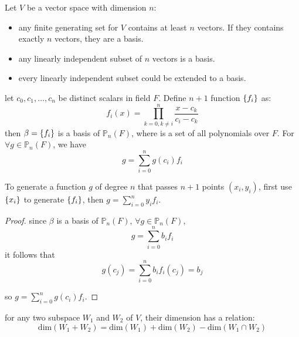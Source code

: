 \begin{theorem}
    Let $V$ be a vector space with dimension $n$:
    \begin{itemize}
        \item any finite generating set for $V$ contains at least $n$ vectors. If they contains exactly $n$ vectors, they are a basis.
        \item any linearly independent subset of $n$ vectors is a basis.
        \item every linearly independent subset could be extended to a basis.
    \end{itemize}    
\end{theorem}




\begin{definition}\label{lagrangeinterpolationformula}
let ${c_0, c_1, \dots, c_n}$ be distinct scalars in field $F$. Define  $n+1$ function $\set{f_i}$ as:
	\begin{equation}
	f_i(x) = \prod_{k=0, k \neq i}^n \frac{x - c_k}{c_i - c_k}
\end{equation}
then $\beta = \set{f_i}$ is a basis of $\mathbb{P}_n(F)$, where  is a set of all polynomials over $F$. For $\forall g \in \mathbb{P}_n(F)$, we have
	\begin{equation}
		g = \sum_{i=0}^n g(c_i) f_i
	\end{equation}
	
	To generate a function $g$ of degree $n$ that passes $n+1$ points $(x_i, y_i)$, first use $\set{x_i}$ to generate $\set{f_i}$, then $g = \sum\limits_{i=0}^n y_i f_i $.
\end{definition}


\begin{proof}
	since $\beta$ is a basis of $\mathbb{P}_n(F)$, $\forall g \in \mathbb{P}_n(F)$,
	\begin{equation*}
		g = \sum_{i=0}^n b_i f_i
	\end{equation*}
	it follows that
	\begin{equation*}
		g(c_j) = \sum_{i=0}^n b_i f_i(c_j) = b_j
	\end{equation*}

	so $g = \sum\limits_{i=0}^n g(c_i) f_i$.
\end{proof}


\begin{theorem}
for any two subspace $W_1$ and $W_2$ of $V$, their dimension has a relation:
\begin{equation}
	\text{dim}(W_1 + W_2) = \text{dim}(W_1) + \text{dim}(W_2) - \text{dim}(W_1 \cap W_2)
\end{equation}
\end{theorem}


